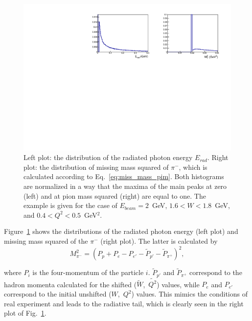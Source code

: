 \begin{figure}[!ht]
\begin{center}
\includegraphics[height=0.4\textwidth]{pictures/radeff/miss_mass_pim_eradgam.pdf}
\end{center}
\vspace{-0.6cm}
\caption{\small Left plot: the distribution of the radiated photon energy $E_{rad}$. Right plot: the distribution of missing mass squared of $\pi^{-}$, which is calculated according to Eq.~\eqref{eq:miss_mass_pim}. Both histograms are normalized in a way that the maxima of the main peaks at zero (left) and at pion mass squared (right) are equal to one. The example is given for the case of $E_{beam} = 2$~GeV, $1.6 < W < 1.8$~GeV, and $0.4 < Q^{2} < 0.5$~GeV$^{2}$.}
\label{fig:miss_mass_pim_eradgam}
\end{figure}

Figure~\ref{fig:miss_mass_pim_eradgam} shows the distributions of the radiated photon energy (left plot) and missing mass squared of the $\pi^{-}$ (right plot). The latter is calculated by
\begin{equation} \label{eq:miss_mass_pim}
M_{\pi^{-}}^{2} = (P_{p} + P_{e} - P_{e'} - \widetilde{P}_{p'} - \widetilde{P}_{\pi^{+}})^{2},
\end{equation}

where $P_{i}$ is the four-momentum of the particle $i$. $\widetilde{P}_{p'}$ and $\widetilde{P}_{\pi^{+}}$ correspond to the hadron momenta calculated for the shifted ($\widetilde{W}$,~$\widetilde{Q^2}$) values, while $P_{e}$ and $P_{e'}$ correspond to the initial unshifted ($W$,~$Q^2$) values. This mimics the conditions of real experiment and leads to the radiative tail, which is clearly seen in the right plot of Fig.~\ref{fig:miss_mass_pim_eradgam}.






